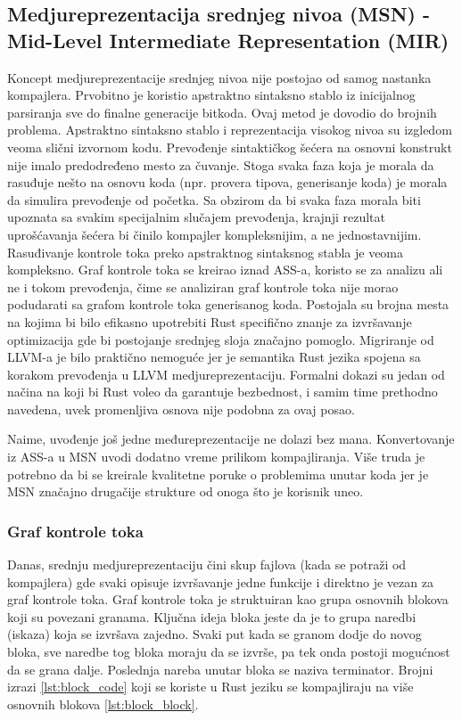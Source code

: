 \subsection{Medjureprezentacija srednjeg nivoa (MSN) - Mid-Level Intermediate Representation (MIR)}

Koncept medjureprezentacije srednjeg nivoa nije postojao od samog nastanka kompajlera. Prvobitno je koristio apstraktno sintaksno stablo 
iz inicijalnog parsiranja sve do finalne generacije bitkoda. Ovaj metod je dovodio do brojnih problema. Apstraktno sintaksno stablo i reprezentacija 
visokog nivoa su izgledom veoma slični izvornom kodu. Prevođenje sintaktičkog šećera na osnovni konstrukt nije imalo predodređeno mesto za čuvanje. 
Stoga svaka faza koja je morala da rasuđuje nešto na osnovu koda (npr. provera tipova, generisanje koda) je morala da simulira prevođenje od početka.
Sa obzirom da bi svaka faza morala biti upoznata sa svakim specijalnim slučajem prevođenja, krajnji rezultat uprošćavanja šećera bi činilo kompajler 
kompleksnijim, a ne jednostavnijim. Rasuđivanje kontrole toka preko apstraktnog sintaksnog stabla je veoma kompleksno. Graf kontrole toka se kreirao
iznad ASS-a, koristo se za analizu ali ne i tokom prevođenja, čime se analiziran graf kontrole toka nije morao podudarati sa grafom kontrole toka generisanog koda. 
Postojala su brojna mesta na kojima bi bilo efikasno upotrebiti Rust specifično znanje za izvršavanje optimizacija gde bi postojanje srednjeg sloja značajno pomoglo.
Migriranje od LLVM-a je bilo praktično nemoguće jer je semantika Rust jezika spojena sa korakom prevođenja u LLVM medjureprezentaciju.
Formalni dokazi su jedan od načina na koji bi Rust voleo da garantuje bezbednost, i samim time prethodno navedena, uvek promenljiva 
osnova nije podobna za ovaj posao.

Naime, uvođenje još jedne međureprezentacije ne dolazi bez mana. Konvertovanje iz ASS-a u MSN uvodi dodatno vreme prilikom kompajliranja. Više truda je potrebno 
da bi se kreirale kvalitetne poruke o problemima unutar koda jer je MSN značajno drugačije strukture od onoga što je korisnik uneo.

\subsubsection{Graf kontrole toka}

Danas, srednju medjureprezentaciju čini skup fajlova (kada se potraži od kompajlera) gde svaki opisuje izvršavanje jedne funkcije i direktno je vezan za graf kontrole toka. Graf kontrole toka je 
struktuiran kao grupa osnovnih blokova koji su povezani granama. Ključna ideja bloka jeste da je to grupa naredbi (iskaza) 
koja se izvršava zajedno. Svaki put kada se granom dodje do novog bloka, sve naredbe tog bloka moraju da se izvrše, pa tek onda postoji mogućnost 
da se grana dalje. Poslednja nareba unutar bloka se naziva terminator. Brojni izrazi \ref{lst:block_code} koji se koriste u Rust jeziku se kompajliraju na 
više osnovnih blokova \ref{lst:block_block}.

